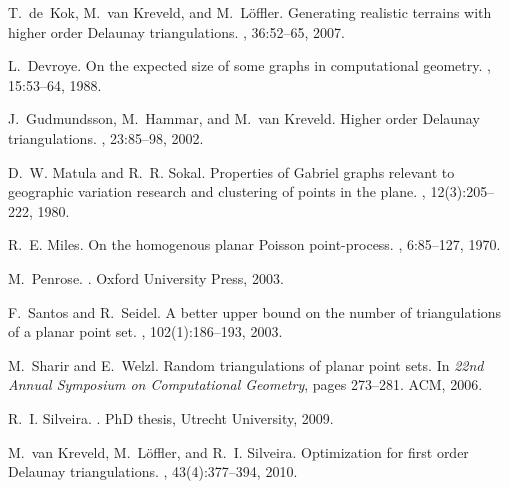 \documentclass {journal}
\begin{document}
\begin{thebibliography}{99}
T.~de~Kok, M.~van Kreveld, and M.~L{\"o}ffler.
\newblock Generating realistic terrains with higher order {D}elaunay
  triangulations.
, 36:52--65, 2007.

L.~Devroye.
\newblock On the expected size of some graphs in computational geometry.
, 15:53--64, 1988.

J.~Gudmundsson, M.~Hammar, and M.~van Kreveld.
\newblock Higher order {D}elaunay triangulations.
, 23:85--98, 2002.

D.~W. Matula and R.~R. Sokal.
\newblock Properties of {Gabriel} graphs relevant to geographic variation
  research and clustering of points in the plane.
, 12(3):205--222, 1980.

R.~E. Miles.
\newblock On the homogenous planar {Poisson} point-process.
, 6:85--127, 1970.

M.~Penrose.
.
\newblock Oxford University Press, 2003.

F.~Santos and R.~Seidel.
\newblock A better upper bound on the number of triangulations of a planar
  point set.
, 102(1):186--193, 2003.

M.~Sharir and E.~Welzl.
\newblock Random triangulations of planar point sets.
\newblock In {\em 22nd Annual Symposium on Computational Geometry}, pages
  273--281. ACM, 2006.

R.~I. Silveira.
.
\newblock PhD thesis, Utrecht University, 2009.

M.~van Kreveld, M.~L{\"o}ffler, and R.~I. Silveira.
\newblock Optimization for first order {D}elaunay triangulations.
, 43(4):377--394, 2010.

\end{thebibliography}
\end{document}
